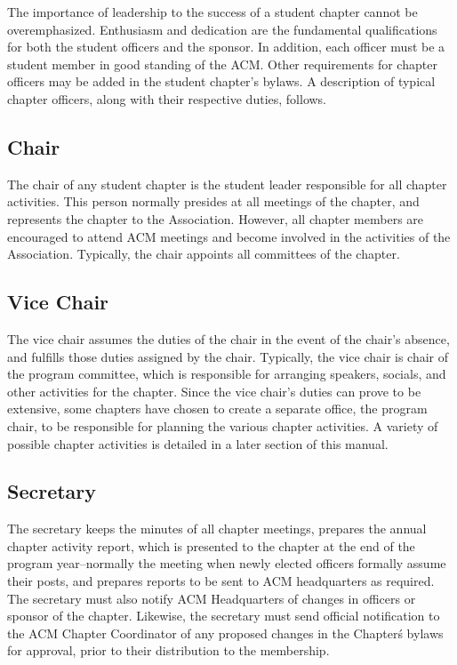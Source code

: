 The importance of leadership to the success of a student chapter cannot be
overemphasized. Enthusiasm and dedication are the fundamental qualifications for
both the student officers and the sponsor. In addition, each officer must be a
student member in good standing of the ACM. Other requirements for chapter
officers may be added in the student chapter's bylaws. A description of typical
chapter officers, along with their respective duties, follows.

\subsection*{Chair}
The chair of any student chapter is the student leader responsible for all
chapter activities. This person normally presides at all meetings of the chapter,
and represents the chapter to the Association. However, all chapter members are
encouraged to attend ACM meetings and become involved in the activities of the
Association. Typically, the chair appoints all committees of the chapter.

\subsection*{Vice Chair}
The vice chair assumes the duties of the chair in the event of the chair's
absence, and fulfills those duties assigned by the chair. Typically, the vice
chair is chair of the program committee, which is responsible for arranging
speakers, socials, and other activities for the chapter. Since the vice chair's
duties can prove to be extensive, some chapters have chosen to create a separate
office, the program chair, to be responsible for planning the various chapter
activities. A variety of possible chapter activities is detailed in a later
section of this manual.

\subsection*{Secretary}
The secretary keeps the minutes of all chapter meetings, prepares the annual
chapter activity report, which is presented to the chapter at the end of the
program year--normally the meeting when newly elected officers formally assume
their posts, and prepares reports to be sent to ACM headquarters as required.
The secretary must also notify ACM Headquarters of changes in officers or
sponsor of the chapter. Likewise, the secretary must send official notification
to the ACM Chapter Coordinator of any proposed changes in the Chapter\'s bylaws
for approval, prior to their distribution to the membership.

